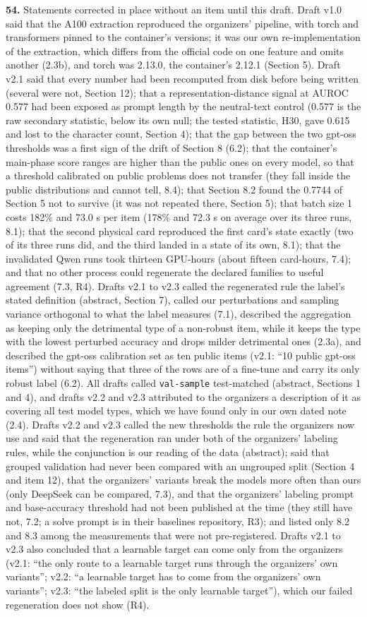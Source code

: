 \noindent\textbf{54.} Statements corrected in place without an item until this draft. Draft v1.0 said that the A100 extraction reproduced the organizers' pipeline, with torch and transformers pinned to the container's versions; it was our own re-implementation of the extraction, which differs from the official code on one feature and omits another (2.3b), and torch was 2.13.0, the container's 2.12.1 (Section 5). Draft v2.1 said that every number had been recomputed from disk before being written (several were not, Section 12); that a representation-distance signal at AUROC 0.577 had been exposed as prompt length by the neutral-text control (0.577 is the raw secondary statistic, below its own null; the tested statistic, H30, gave 0.615 and lost to the character count, Section 4); that the gap between the two gpt-oss thresholds was a first sign of the drift of Section 8 (6.2); that the container's main-phase score ranges are higher than the public ones on every model, so that a threshold calibrated on public problems does not transfer (they fall inside the public distributions and cannot tell, 8.4); that Section 8.2 found the 0.7744 of Section 5 not to survive (it was not repeated there, Section 5); that batch size 1 costs 182\% and 73.0 s per item (178\% and 72.3 s on average over its three runs, 8.1); that the second physical card reproduced the first card's state exactly (two of its three runs did, and the third landed in a state of its own, 8.1); that the invalidated Qwen runs took thirteen GPU-hours (about fifteen card-hours, 7.4); and that no other process could regenerate the declared families to useful agreement (7.3, R4). Drafts v2.1 to v2.3 called the regenerated rule the label's stated definition (abstract, Section 7), called our perturbations and sampling variance orthogonal to what the label measures (7.1), described the aggregation as keeping only the detrimental type of a non-robust item, while it keeps the type with the lowest perturbed accuracy and drops milder detrimental ones (2.3a), and described the gpt-oss calibration set as ten public items (v2.1: ``10 public gpt-oss items'') without saying that three of the rows are of a fine-tune and carry its only robust label (6.2). All drafts called \texttt{val-sample} test-matched (abstract, Sections 1 and 4), and drafts v2.2 and v2.3 attributed to the organizers a description of it as covering all test model types, which we have found only in our own dated note (2.4). Drafts v2.2 and v2.3 called the new thresholds the rule the organizers now use and said that the regeneration ran under both of the organizers' labeling rules, while the conjunction is our reading of the data (abstract); said that grouped validation had never been compared with an ungrouped split (Section 4 and item 12), that the organizers' variants break the models more often than ours (only DeepSeek can be compared, 7.3), and that the organizers' labeling prompt and base-accuracy threshold had not been published at the time (they still have not, 7.2; a solve prompt is in their baselines repository, R3); and listed only 8.2 and 8.3 among the measurements that were not pre-registered. Drafts v2.1 to v2.3 also concluded that a learnable target can come only from the organizers (v2.1: ``the only route to a learnable target runs through the organizers' own variants''; v2.2: ``a learnable target has to come from the organizers' own variants''; v2.3: ``the labeled split is the only learnable target''), which our failed regeneration does not show (R4).\par
